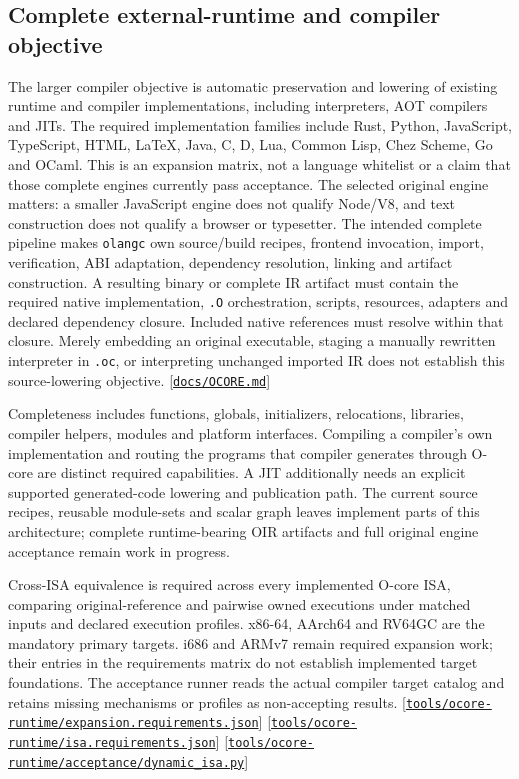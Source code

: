 \documentclass[11pt,oneside]{article}
\newcommand{\src}[1]{\textcolor{OSlate}{\scriptsize[\href{https://github.com/lostadi/OSTADIX/blob/c0b02c326b2329a95ba52447c7180bc93957cd57/#1}{\nolinkurl{#1}}]}\allowbreak}
\begin{document}
\subsection{Complete external-runtime and compiler objective}

The larger compiler objective is automatic preservation and lowering of
existing runtime and compiler implementations, including interpreters, AOT
compilers and JITs. The required implementation families include Rust,
Python, JavaScript, TypeScript, HTML, LaTeX, Java, C, D, Lua, Common Lisp,
Chez Scheme, Go and OCaml. This is an expansion matrix, not a language
whitelist or a claim that those complete engines currently pass acceptance.
The selected original engine matters: a smaller JavaScript engine does not
qualify Node/V8, and text construction does not qualify a browser or typesetter. The intended complete pipeline makes \texttt{olangc} own
source/build recipes, frontend invocation, import, verification, ABI adaptation,
dependency resolution, linking and artifact construction. A resulting binary
or complete IR artifact must contain the required native implementation,
\texttt{.O} orchestration, scripts, resources, adapters and declared dependency
closure. Included native references must resolve within that closure. Merely
embedding an original executable, staging a manually rewritten interpreter in
\texttt{.oc}, or interpreting unchanged imported IR does not establish this
source-lowering objective.
\src{docs/OCORE.md}

Completeness includes functions, globals, initializers, relocations, libraries,
compiler helpers, modules and platform interfaces. Compiling a compiler's own
implementation and routing the programs that compiler generates through
O-core are distinct required capabilities. A JIT additionally needs an
explicit supported generated-code lowering and publication path. The current
source recipes, reusable module-sets and scalar graph leaves implement parts
of this architecture; complete runtime-bearing OIR artifacts and full original
engine acceptance remain work in progress.

Cross-ISA equivalence is required across every implemented O-core ISA,
comparing original-reference and pairwise owned executions under matched
inputs and declared execution profiles. x86-64, AArch64 and RV64GC are the
mandatory primary targets. i686 and ARMv7 remain required expansion work;
their entries in the requirements matrix do not establish implemented target
foundations. The acceptance runner reads the actual compiler target catalog
and retains missing mechanisms or profiles as non-accepting results.
\src{tools/ocore-runtime/expansion.requirements.json}
\src{tools/ocore-runtime/isa.requirements.json}
\src{tools/ocore-runtime/acceptance/dynamic_isa.py}
\end{document}
